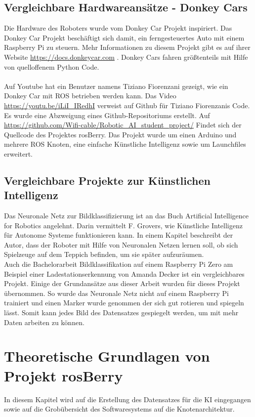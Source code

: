 \documentclass[conference]{IEEEtran}
\begin{document}
	\subsection{Vergleichbare Hardwareansätze - Donkey Cars} %
	Die Hardware des Roboters wurde vom Donkey Car Projekt inspiriert.
	Das Donkey Car Projekt beschäftigt sich damit, ein ferngesteuertes Auto mit einem Raspberry Pi zu steuern.
	Mehr Informationen zu diesem Projekt gibt es auf ihrer Website 
	\url{https://docs.donkeycar.com} .
	Donkey Cars fahren größtenteils mit Hilfe von quelloffenem Python Code. \\
	\\
	Auf Youtube hat ein Benutzer namens Tiziano Fiorenzani gezeigt, wie ein Donkey Car mit ROS betrieben werden kann.
	Das Video \url{https://youtu.be/iLiI\_IRedhI}  verweist auf Github für 
	Tiziano 
	Fiorenzanis Code. Es wurde eine Abzweigung eines Github-Repositoriums 
	erstellt. Auf 
	\url{https://github.com/Wifi-cable/Robotic_AI_student_project/}
	Findet sich der Quellcode des Projektes rosBerry. 
	Das Projekt wurde um einen Arduino und mehrere ROS Knoten, eine 
	einfache Künstliche Intelligenz sowie um Launchfiles erweitert.
		
	\subsection{Vergleichbare Projekte zur Künstlichen Intelligenz} 
	Das Neuronale Netz zur Bildklassifizierung ist an das Buch \glqq Artificial Intelligence for Robotics\grqq  \cite{govers2018artificial} angelehnt.
	Darin vermittelt F. Grovers, wie Künstliche Intelligenz für Autonome 
	Systeme funktionieren kann.
	In einem Kapitel beschreibt der Autor, dass der Roboter mit Hilfe von Neuronalen Netzen lernen soll, ob sich Spielzeuge auf dem Teppich befinden, um sie später aufzuräumen.\\
	
	Auch die Bachelorarbeit \glqq Bildklassifikation auf einem Raspberry Pi 
	Zero am Beispiel einer Ladestationserkennung\grqq  \cite{Amanda} von 
	Amanda Decker ist ein vergleichbares Projekt.
	Einige der Grundansätze aus dieser Arbeit wurden für dieses Projekt übernommen.
	So wurde das Neuronale Netz nicht auf einem Raspberry Pi trainiert und 
	einen Marker wurde  genommen der sich gut rotieren und spiegeln lässt.
	Somit kann jedes Bild des Datensatzes gespiegelt werden, um mit mehr 
	Daten arbeiten zu können.
	
	\section{Theoretische Grundlagen von Projekt rosBerry}
	In diesem Kapitel wird auf die Erstellung des Datensatzes für die KI eingegangen sowie auf die Grobübersicht des Softwaresystems auf die Knotenarchitektur. %
	
\end{document}

